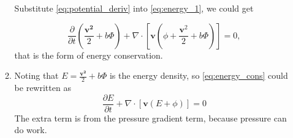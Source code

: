 \documentclass[a4paper]{article}
\begin{document}
\begin{enumerate}[label=\textbf{\arabic*.}]
\begin{enumerate}[label=(\alph*)]
	Substitute \eqref{eq:potential_deriv} into \eqref{eq:energy_1}, we could get
	
	\begin{equation}\label{eq:energy_cons}
	\frac{\partial }{\partial t}\left(\frac{\bm{v^2}}{2}+b\Phi\right)+\nabla \cdot \left[ \bm v \left(\phi +\frac{\bm v^2}{2} +b\Phi\right) \right]=0,
	\end{equation}
	that is the form of energy conservation.

	
	\item Noting that $E=\frac{\bm{v^2}}{2}+b\Phi$ is the energy density, so \eqref{eq:energy_cons} could be rewritten as 
	$$\frac{\partial E}{\partial t}+\nabla \cdot \left[ \bm v \left(E+\phi \right) \right]=0$$
	The extra term is from the pressure gradient term, because pressure can do work.
	\end{enumerate}

\end{enumerate}
\end{document}
